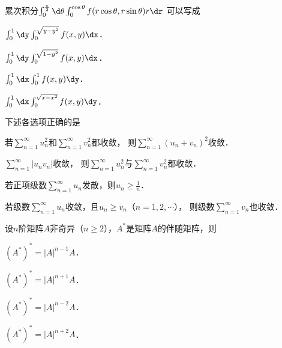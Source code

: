 \documentclass[plain,noanswer,medmath]{../../template/jnuexam}
\begin{document}


\begin{problem}
累次积分$\int_0^{\frac{\pi}{2}} \d\theta \int_0^{\cos \theta} f(r\cos \theta ,r\sin \theta) r\dr$
可以写成\pickout{}
\begin{abcd}
\item $\int_0^1\dy\int_0^{\sqrt{y - y^2}} f(x,y) \dx$．				
\item $\int_0^1\dy\int_0^{\sqrt{1 - y^2}} f(x,y) \dx$．
\item $\int_0^1\dx\int_0^1f(x,y) \dy$．					
\item $\int_0^1\dx\int_0^{\sqrt{x - x^2}} f(x,y) \dy$．
\end{abcd}
\end{problem}


\begin{problem}
下述各选项正确的是\pickout{}
\begin{abcd}
\item 若$\sum_{n = 1}^{\infty}u_n^2$和$\sum_{n = 1}^{\infty}v_n^2$都收敛，
      则$\sum_{n = 1}^{\infty}(u_n^{} + v_n)^2$收敛．
\item $\sum_{n = 1}^{\infty}\left| u_n^{}v_n \right|$收敛，
      则$\sum_{n = 1}^{\infty}u_n^2$与$\sum_{n = 1}^{\infty}v_n^2$都收敛．
\item 若正项级数$\sum_{n = 1}^{\infty}u_n^{}$发散，则$u_n^{} \ge \frac{1}{n}$．
\item 若级数$\sum_{n = 1}^{\infty}u_n^{}$收敛，且$u_n^{} \ge v_n$（$n = 1,2, \cdots$），
      则级数$\sum_{n = 1}^{\infty}v_n^{}$也收敛．
\end{abcd}
\end{problem}


\begin{problem}
设$n$阶矩阵$A$非奇异（$n \ge 2$），$A^*$是矩阵$A$的伴随矩阵，则\pickout{}
\begin{abcd}
\item $(A^*)^* = |A|^{n - 1} A$．		
\item $(A^*)^* = |A|^{n + 1} A$．
\item $(A^*)^* = |A|^{n - 2} A$．		
\item $(A^*)^* = |A|^{n + 2} A$．
\end{abcd}
\end{problem}
\end{document}
